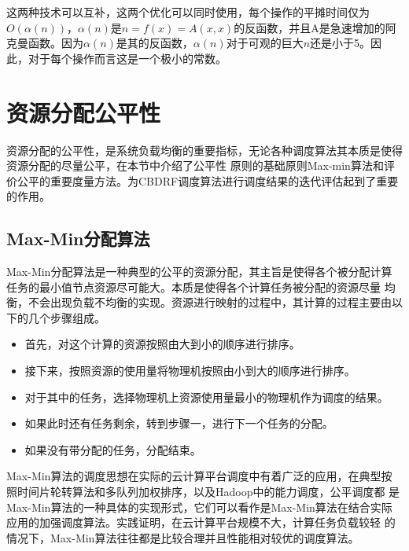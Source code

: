 这两种技术可以互补，这两个优化可以同时使用，每个操作的平摊时间仅为$O(\alpha(n))$，$\alpha(n)$是$n = f(x) = A(x,x)$的反函数，并且A是急速增加的阿克曼函数。因为$\alpha(n)$是其的反函数，$\alpha(n)$对于可观的巨大$n$还是小于5。因此，对于每个操作而言这是一个极小的常数。

\section{资源分配公平性}
资源分配的公平性，是系统负载均衡的重要指标，无论各种调度算法其本质是使得资源分配的尽量公平，在本节中介绍了公平性
原则的基础原则Max-min算法和评价公平的重要度量方法。为CBDRF调度算法进行调度结果的迭代评估起到了重要的作用。
\subsection{Max-Min分配算法}
Max-Min分配算法是一种典型的公平的资源分配，其主旨是使得各个被分配计算任务的最小值节点资源尽可能大。本质是使得各个计算任务被分配的资源尽量
均衡，不会出现负载不均衡的实现。资源进行映射的过程中，其计算的过程主要由以下的几个步骤组成。
\begin{itemize}
\item	首先，对这个计算的资源按照由大到小的顺序进行排序。
\item	接下来，按照资源的使用量将物理机按照由小到大的顺序进行排序。
\item	对于其中的任务，选择物理机上资源使用量最小的物理机作为调度的结果。
\item	如果此时还有任务剩余，转到步骤一，进行下一个任务的分配。
\item	如果没有带分配的任务，分配结束。
\end{itemize}

Max-Min算法的调度思想在实际的云计算平台调度中有着广泛的应用，在典型按照时间片轮转算法和多队列加权排序，以及Hadoop中的能力调度，公平调度都
是Max-Min算法的一种具体的实现形式，它们可以看作是Max-Min算法在结合实际应用的加强调度算法。实践证明，在云计算平台规模不大，计算任务负载较轻
的情况下，Max-Min算法往往都是比较合理并且性能相对较优的调度算法。

